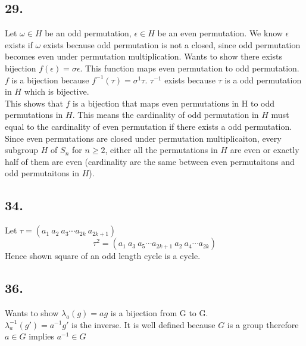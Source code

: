 \documentclass{article}
\begin{document}
\subsection*{29. }
Let $\omega \in H$ be an odd permutation, $\epsilon \in H$ be an even
permutation. We know $\epsilon$ exists if $\omega$ exists because odd
permutation is not a closed, since odd permutation becomes even under
permutation multiplication. Wants to show there exists bijection 
$f(\epsilon) = \sigma\epsilon$. This function maps even permutation to odd
permutation. $f$ is a bijection because $f^{-1}(\tau) = \sigma^{1}\tau$.
$\tau^{-1}$ exists because $\tau$ is a odd permutation in $H$ which is
bijective.\\
This shows that $f$ is a bijection that maps even permutations in H to odd 
permutations in $H$. This means the cardinality of odd permutation in $H$ must equal
to the cardinality of even permutation if there exists a odd permutation. Since
even permutations are closed under permutation multiplicaiton, every subgroup
$H$ of $S_n$ for $n \ge 2$, either all the permutations in $H$ are even or
exactly half of them are even (cardinality are the same between even
permutaitons and odd permutaitons in $H$).

\subsection*{34. }
Let $\tau = (a_1\ a_2\ a_3 \cdots a_{2k}\ a_{2k+1})$
$$\tau^2 = (a_1\ a_3\ a_5 \cdots a_{2k+1}\ a_2\ a_4 \cdots a_{2k})$$
Hence shown square of an odd length cycle is a cycle.

\subsection*{36. }
Wants to show $\lambda_a(g) = ag$ is a bijection from G to G.\\
$\lambda_a^{-1}(g') = a^{-1}g'$ is the inverse. It is well defined because $G$
is a group therefore $a \in G$ implies $a^{-1} \in G$
\end{document}
